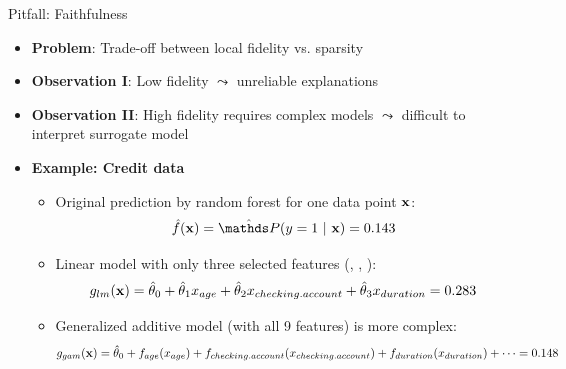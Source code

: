 \documentclass[11pt,compress,t,notes=noshow, aspectratio=169, xcolor=table]{beamer}
\begin{document}
\begin{frame}[c]{Pitfall: Faithfulness}
\begin{itemize}
	\item \textbf{Problem}: Trade-off between local fidelity vs. sparsity
	\item \textbf{Observation I}: Low fidelity $\leadsto$ unreliable explanations
	\item \textbf{Observation II}: High fidelity requires complex models $\leadsto$ difficult to interpret surrogate model %
	\pause
	\item \textbf{Example: Credit data} 
	\begin{itemize}
	\itemsep0em
	    \item Original prediction by random forest for one data point $\xv$: 
	    $$\fh(\xv) = \hat{\P}(y = 1 ~|~ \xv) = 0.143$$
	    \item %
	    Linear model with only three selected features (, , ):
	    $$g_{lm}(\xv) = \thetah_0 + \thetah_1 x_{age} + \thetah_2 x_{checking.account} + \thetah_3 x_{duration} = 0.283$$
	    \item Generalized additive model (with all 9 features) is more complex:
    $$%
    g_{gam}(\xv) = \thetah_0 + f_{age}(x_{age}) + f_{checking.account}(x_{checking.account}) + f_{duration}(x_{duration}) +  \dots %
    = 0.148$$
	\end{itemize}
\end{itemize}

\end{frame}
\end{document}
